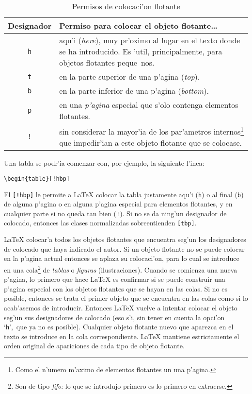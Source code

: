 \begin{table}[!bp]
\caption{Permisos de colocaci'on flotante}\label{tab:permiss}
\noindent \begin{minipage}{\textwidth}
\medskip
\begin{center}
\begin{tabular}{@{}cp{10cm}@{}}
  Designador&Permiso para colocar el objeto flotante\ldots\\ \hline
  \rule{0pt}{1.05em}
\texttt{h} & aqu'i (\emph{here}), muy pr'oximo al
  lugar en el texto donde se ha introducido. Es 'util, principalmente,
  para objetos flotantes peque~nos.\\[0.3ex]
\texttt{t} & en la parte superior de una p'agina (\emph{top}).\\[0.3ex]
\texttt{b} & en la parte inferior de una p'agina
  (\emph{bottom}).\\[0.3ex]
\texttt{p} & en una \emph{p'agina} especial que s'olo contenga
  elementos flotantes.\\[0.3ex]
\texttt{!} & sin considerar la mayor'ia de los par'ametros
  internos\footnote{Como el n'umero m'aximo de elementos flotantes un
  una p'agina.} que impedir'ian a este objeto flotante que se colocase.
\end{tabular}
\end{center}
\end{minipage}
\end{table}

\pagebreak[3]
Una tabla se podr'ia comenzar con, por ejemplo, la siguiente l'inea:
\begin{code}
\verb|\begin{table}[!hbp]|
\end{code}
\noindent El  \verb|[!hbp]| le permite a
\LaTeX{} colocar la tabla justamente aqu'i (\texttt{h}) o al final
 (\texttt{b}) de alguna p'agina o en alguna p'agina especial para
 elementos flotantes, y en cualquier parte si no queda tan bien
 (\texttt{!}). Si no se da ning'un designador de colocado, entonces
 las clases normalizadas sobreentienden \verb|[tbp]|.

 \LaTeX{} colocar'a todos los objetos flotantes que encuentra seg'un
 los de\-sig\-na\-do\-res de colocado que haya indicado el autor. Si
 un objeto flotante no se puede colocar en la p'agina actual entonces
 se aplaza su colocaci'on, para lo cual se introduce en una
 cola\footnote{Son de tipo \emph{fifo}: lo que se introdujo primero es
   lo primero en extraerse.} de \emph{tablas} o \emph{figuras}
 (ilustraciones).  Cuando se comienza una nueva p'agina, lo primero
 que hace \LaTeX{} es confirmar si se puede construir una p'agina
 especial con los objetos flotantes que se hayan en las colas. Si no
 es posible, entonces se trata el primer objeto que se encuentra en
 las colas como si lo acab'asemos de introducir. Entonces \LaTeX{}
 vuelve a intentar colocar el objeto seg'un sus designadores de
 colocado (eso s'i, sin tener en cuenta la opci'on `\verb|h|',\ que ya
 no es posible). Cualquier objeto flotante nuevo que aparezca en el
 texto se introduce en la cola correspondiente. \LaTeX{} mantiene
 estrictamente el orden original de apariciones de cada tipo de objeto
 flotante.

